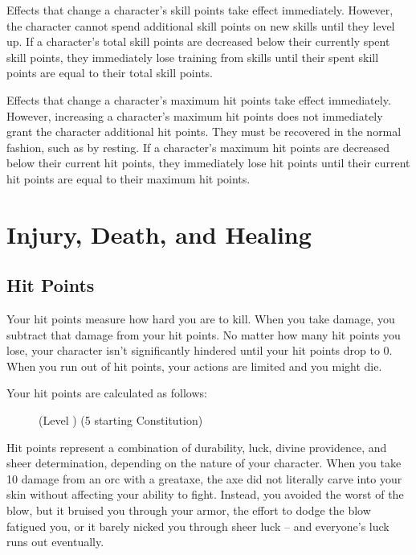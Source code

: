          Effects that change a character's skill points take effect immediately.
        However, the character cannot spend additional skill points on new skills until they level up.
        If a character's total skill points are decreased below their currently spent skill points, they immediately lose training from skills until their spent skill points are equal to their total skill points.

         Effects that change a character's maximum hit points take effect immediately.
        However, increasing a character's maximum hit points does not immediately grant the character additional hit points.
        They must be recovered in the normal fashion, such as by resting.
        If a character's maximum hit points are decreased below their current hit points, they immediately lose hit points until their current hit points are equal to their maximum hit points.

\section{Injury, Death, and Healing}\label{Injury, Death, and Healing}

    \subsection{Hit Points}\label{Hit Points}
        Your hit points measure how hard you are to kill.
        When you take damage, you subtract that damage from your hit points.
        No matter how many hit points you lose, your character isn't significantly hindered until your hit points drop to 0.
        When you run out of hit points, your actions are limited and you might die.

        Your hit points are calculated as follows:

        \begin{figure}[h]
            \centering (Level ) \x (5 \add starting Constitution)
        \end{figure}

         Hit points represent a combination of durability, luck, divine providence, and sheer determination, depending on the nature of your character.
        When you take 10 damage from an orc with a greataxe, the axe did not literally carve into your skin without affecting your ability to fight.
        Instead, you avoided the worst of the blow, but it bruised you through your armor, the effort to dodge the blow fatigued you, or it barely nicked you through sheer luck -- and everyone's luck runs out eventually.

